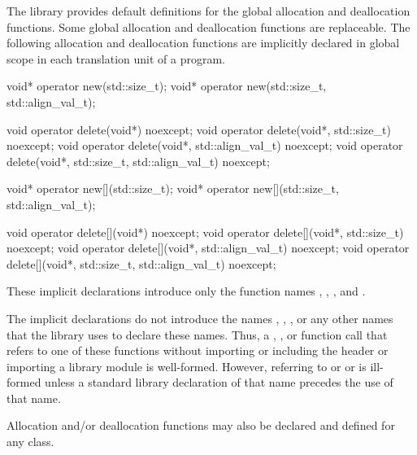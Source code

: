 \pnum
The library provides default definitions for the global allocation and
deallocation functions. Some global allocation and deallocation
functions are replaceable.
The following allocation and deallocation functions
are implicitly declared in global scope in each translation unit of a
program.

\begin{codeblock}
void* operator new(std::size_t);
void* operator new(std::size_t, std::align_val_t);

void operator delete(void*) noexcept;
void operator delete(void*, std::size_t) noexcept;
void operator delete(void*, std::align_val_t) noexcept;
void operator delete(void*, std::size_t, std::align_val_t) noexcept;

void* operator new[](std::size_t);
void* operator new[](std::size_t, std::align_val_t);

void operator delete[](void*) noexcept;
void operator delete[](void*, std::size_t) noexcept;
void operator delete[](void*, std::align_val_t) noexcept;
void operator delete[](void*, std::size_t, std::align_val_t) noexcept;
\end{codeblock}

These implicit declarations introduce only the function names
,
,
, and
.
\begin{note}
The implicit declarations do not introduce
the names ,
,
,
or any other names that the library uses to
declare these names. Thus, a ,
, or function call that refers to one of
these functions without importing or including the header 
or importing a \Cpp{} library module
is well-formed. However, referring to 
or 
or 
is ill-formed unless
a standard library declaration
of that name precedes the use of that name.
\end{note}
Allocation and/or
deallocation functions may also be declared and defined for any
class.

